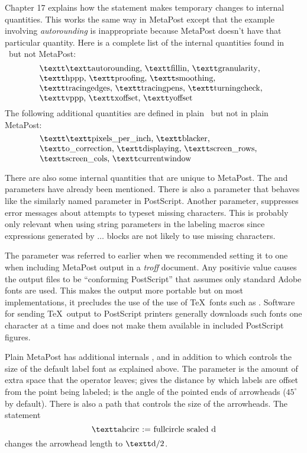Chapter 17 explains how the  statement makes temporary changes
to internal quantities.  This works the same way in MetaPost except that
the example involving {\it autorounding} is inappropriate because MetaPost
doesn't have that particular quantity.  Here is a complete list of the
internal quantities found in \MF\ but not MetaPost:
$$\vcenter{\hsize=.8\hsize \raggedright \multiply\rightskip by3 \textt\noindent
	\lit{autorounding}, \lit{fillin}, \lit{granularity}, \lit{hppp},
	\lit{proofing}, \lit{smoothing}, \lit{tracingedges},
	\lit{tracingpens}, \lit{turningcheck}, \lit{vppp}, \lit{xoffset},
	\lit{yoffset}}
$$
The following additional quantities are defined in plain \MF\ but not in
plain MetaPost:
$$\vcenter{\hsize=.8\hsize \raggedright \multiply\rightskip by3 \textt\noindent
	\lit{pixels\_per\_inch}, \lit{blacker}, \lit{o\_correction},
	\lit{displaying}, \lit{screen\_rows}, \lit{screen\_cols},
	\lit{currentwindow}}
$$

There are also some internal quantities that are unique to MetaPost.
The  and  parameters have already been mentioned.
There is also a  parameter that behaves like the similarly
named parameter in PostScript.  Another parameter, 
suppresses error messages about attempts to typeset missing characters.
This is probably only relevant when using string parameters in the labeling
macros since expressions generated by  $\ldots$ 
blocks are not likely to use missing characters.  

The  parameter was referred to earlier when we recommended
setting it to one when including MetaPost output in a {\it troff\/} document.
Any positivie value causes the output files to be ``conforming PostScript''
that assumes only standard Adobe fonts are used.  This makes the output
more portable but on most implementations, it precludes the use of the use
of \TeX\ fonts such as .  Software for sending \TeX\ output to
PostScript printers generally downloads such fonts one character at a time
and does not make them available in included PostScript figures.

Plain MetaPost has
additional internals ,  and 
in addition to  which controls the size of the default label
font as explained above.  The  parameter is the amount of
extra space that the  operator leaves;  gives the
distance by which labels are offset from the point being labeled;
 is the angle of the pointed ends of arrowheads
($45^\circ$ by default).  There is also a path  that controls
the size of the arrowheads.  The statement
$$ \lit{ahcirc := fullcircle scaled d} $$
changes the arrowhead length to $\lit{d}/2$.

